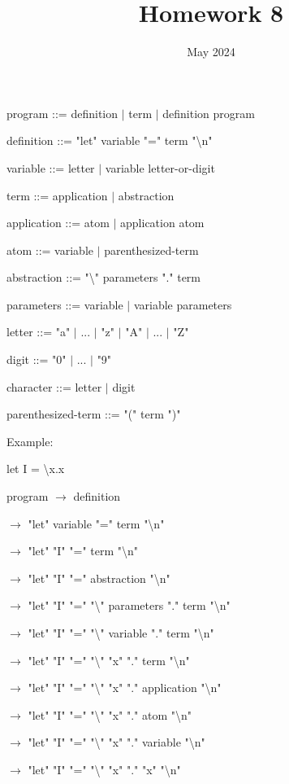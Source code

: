 \documentclass{article}
\title{Homework 8}
\date{May 2024}
\begin{document}
    \maketitle

    program ::= definition $\vert$ term $\vert$ definition program
    
    definition ::= "let" variable "=" term "\textbackslash n"

    variable ::= letter $\vert$ variable letter-or-digit

    term ::= application $\vert$ abstraction

    application ::= atom $\vert$ application atom

    atom ::= variable $\vert$ parenthesized-term

    abstraction ::= "\textbackslash" parameters "." term

    parameters ::= variable $\vert$ variable parameters

    letter ::= "a" $\vert$ ... $\vert$ "z" $\vert$ "A" $\vert$ ... $\vert$ "Z"

    digit ::= "0" $\vert$ ... $\vert$ "9"

    character ::= letter $\vert$ digit

    parenthesized-term ::= "(" term ")"
    \newline

    Example:

    let I = \textbackslash x.x
    \newline

  program $\rightarrow$ definition 

  $\rightarrow$ "let" variable "=" term "\textbackslash n"
  
  $\rightarrow$ "let" "I" "=" term "\textbackslash n"
  
  $\rightarrow$ "let" "I" "=" abstraction "\textbackslash n"
  
  $\rightarrow$ "let" "I" "=" "\textbackslash" parameters "." term "\textbackslash n" 
  
  $\rightarrow$ "let" "I" "=" "\textbackslash" variable "." term "\textbackslash n"  
  
  $\rightarrow$ "let" "I" "=" "\textbackslash" "x" "." term "\textbackslash n"  

  $\rightarrow$ "let" "I" "=" "\textbackslash" "x" "." application "\textbackslash n"  
  
  $\rightarrow$ "let" "I" "=" "\textbackslash" "x" "." atom "\textbackslash n"  
  
  $\rightarrow$ "let" "I" "=" "\textbackslash" "x" "." variable "\textbackslash n"  
  
  $\rightarrow$ "let" "I" "=" "\textbackslash" "x" "." "x" "\textbackslash n"  
\end{document}
